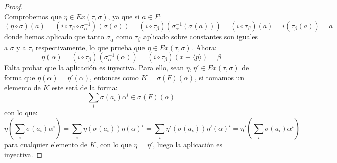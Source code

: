 \begin{prop}[Extensión]
\begin{proof}
\begin{equation*}
        \end{equation*}
        Comprobemos que $\eta\in Ex(\tau,\sigma)$, ya que si $a\in F$:
        \begin{equation*}
            (\eta \circ \sigma)(a) = (i\circ \tau_\beta\circ \sigma_\alpha^{-1})(\sigma(a)) = (i\circ \tau_\beta)(\sigma_\alpha^{-1}(\sigma(a))) = (i\circ \tau_\beta)(a) = i(\tau_\beta(a)) = a
        \end{equation*}
        donde hemos aplicado que tanto $\sigma_\alpha$ como $\tau_\beta$ aplicado sobre constantes son iguales a $\sigma$ y a $\tau$, respectivamente, lo que prueba que $\eta\in Ex(\tau,\sigma)$. Ahora:
        \begin{equation*}
            \eta(\alpha) = (i\circ \tau_\beta)(\sigma_\alpha^{-1}(\alpha))= (i\circ \tau_\beta)(x+\langle p \rangle ) = \beta
        \end{equation*}
        Falta probar que la aplicación es inyectiva. Para ello, sean $\eta,\eta' \in Ex(\tau,\sigma)$ de forma que $\eta(\alpha)=\eta'(\alpha)$, entonces como $K=\sigma(F)(\alpha)$, si tomamos un elemento de $K$ este será de la forma:
        \begin{equation*}
            \sum_{i} \sigma(a_i) \alpha^i \in \sigma(F)(\alpha)
        \end{equation*}
        con lo que:
        \begin{equation*}
            \eta\left(\sum_{i}\sigma(a_i)\alpha^i\right) = \sum_i \eta(\sigma(a_i)) {\eta(\alpha)}^{i} = \sum_i \eta'(\sigma(a_i)) {\eta'(\alpha)}^{i} = \eta'\left(\sum_{i}\sigma(a_i)\alpha^i\right) 
        \end{equation*}
        para cualquier elemento de $K$, con lo que $\eta = \eta'$, luego la aplicación es inyectiva.
    \end{proof}
\end{prop}


